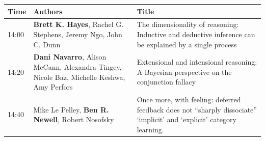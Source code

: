 \documentclass[]{article}
\begin{document}
\begin{longtable}[]{@{}lll@{}}
\toprule
\begin{minipage}[b]{0.03\columnwidth}\raggedright\strut
Time\strut
\end{minipage} & \begin{minipage}[b]{0.39\columnwidth}\raggedright\strut
Authors\strut
\end{minipage} & \begin{minipage}[b]{0.50\columnwidth}\raggedright\strut
Title\strut
\end{minipage}\tabularnewline
\midrule
\endhead
\begin{minipage}[t]{0.03\columnwidth}\raggedright\strut
14:00\strut
\end{minipage} & \begin{minipage}[t]{0.39\columnwidth}\raggedright\strut
\textbf{Brett K. Hayes}, Rachel G. Stephens, Jeremy Ngo, John C.
Dunn\strut
\end{minipage} & \begin{minipage}[t]{0.50\columnwidth}\raggedright\strut
The dimensionality of reasoning: Inductive and deductive inference can
be explained by a single process\strut
\end{minipage}\tabularnewline
\begin{minipage}[t]{0.03\columnwidth}\raggedright\strut
14:20\strut
\end{minipage} & \begin{minipage}[t]{0.39\columnwidth}\raggedright\strut
\textbf{Dani Navarro}, Alison McCann, Alexandra Tingey, Nicole Baz,
Michelle Keshwa, Amy Perfors\strut
\end{minipage} & \begin{minipage}[t]{0.50\columnwidth}\raggedright\strut
Extensional and intensional reasoning: A Bayesian perspective on the
conjunction fallacy\strut
\end{minipage}\tabularnewline
\begin{minipage}[t]{0.03\columnwidth}\raggedright\strut
14:40\strut
\end{minipage} & \begin{minipage}[t]{0.39\columnwidth}\raggedright\strut
Mike Le Pelley, \textbf{Ben R. Newell}, Robert Nosofsky\strut
\end{minipage} & \begin{minipage}[t]{0.50\columnwidth}\raggedright\strut
Once more, with feeling: deferred feedback does not ``sharply
dissociate'' `implicit' and `explicit' category learning.\strut
\end{minipage}\tabularnewline

\end{longtable}
\end{document}
